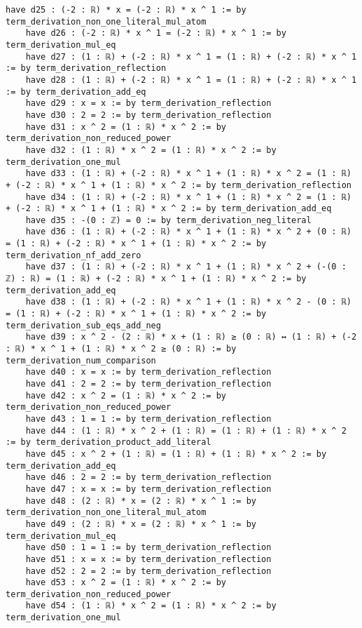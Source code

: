 \documentclass{article}
\begin{document}
\begin{tcolorbox}[colback=white!10, width=\linewidth]
\begin{lstlisting}[language=Lean4]
    have d25 : (-2 : ℝ) * x = (-2 : ℝ) * x ^ 1 := by term_derivation_non_one_literal_mul_atom
    have d26 : (-2 : ℝ) * x ^ 1 = (-2 : ℝ) * x ^ 1 := by term_derivation_mul_eq
    have d27 : (1 : ℝ) + (-2 : ℝ) * x ^ 1 = (1 : ℝ) + (-2 : ℝ) * x ^ 1 := by term_derivation_reflection
    have d28 : (1 : ℝ) + (-2 : ℝ) * x ^ 1 = (1 : ℝ) + (-2 : ℝ) * x ^ 1 := by term_derivation_add_eq
    have d29 : x = x := by term_derivation_reflection
    have d30 : 2 = 2 := by term_derivation_reflection
    have d31 : x ^ 2 = (1 : ℝ) * x ^ 2 := by term_derivation_non_reduced_power
    have d32 : (1 : ℝ) * x ^ 2 = (1 : ℝ) * x ^ 2 := by term_derivation_one_mul
    have d33 : (1 : ℝ) + (-2 : ℝ) * x ^ 1 + (1 : ℝ) * x ^ 2 = (1 : ℝ) + (-2 : ℝ) * x ^ 1 + (1 : ℝ) * x ^ 2 := by term_derivation_reflection
    have d34 : (1 : ℝ) + (-2 : ℝ) * x ^ 1 + (1 : ℝ) * x ^ 2 = (1 : ℝ) + (-2 : ℝ) * x ^ 1 + (1 : ℝ) * x ^ 2 := by term_derivation_add_eq
    have d35 : -(0 : ℤ) = 0 := by term_derivation_neg_literal
    have d36 : (1 : ℝ) + (-2 : ℝ) * x ^ 1 + (1 : ℝ) * x ^ 2 + (0 : ℝ) = (1 : ℝ) + (-2 : ℝ) * x ^ 1 + (1 : ℝ) * x ^ 2 := by term_derivation_nf_add_zero
    have d37 : (1 : ℝ) + (-2 : ℝ) * x ^ 1 + (1 : ℝ) * x ^ 2 + (-(0 : ℤ) : ℝ) = (1 : ℝ) + (-2 : ℝ) * x ^ 1 + (1 : ℝ) * x ^ 2 := by term_derivation_add_eq
    have d38 : (1 : ℝ) + (-2 : ℝ) * x ^ 1 + (1 : ℝ) * x ^ 2 - (0 : ℝ) = (1 : ℝ) + (-2 : ℝ) * x ^ 1 + (1 : ℝ) * x ^ 2 := by term_derivation_sub_eqs_add_neg
    have d39 : x ^ 2 - (2 : ℝ) * x + (1 : ℝ) ≥ (0 : ℝ) ↔ (1 : ℝ) + (-2 : ℝ) * x ^ 1 + (1 : ℝ) * x ^ 2 ≥ (0 : ℝ) := by term_derivation_num_comparison
    have d40 : x = x := by term_derivation_reflection
    have d41 : 2 = 2 := by term_derivation_reflection
    have d42 : x ^ 2 = (1 : ℝ) * x ^ 2 := by term_derivation_non_reduced_power
    have d43 : 1 = 1 := by term_derivation_reflection
    have d44 : (1 : ℝ) * x ^ 2 + (1 : ℝ) = (1 : ℝ) + (1 : ℝ) * x ^ 2 := by term_derivation_product_add_literal
    have d45 : x ^ 2 + (1 : ℝ) = (1 : ℝ) + (1 : ℝ) * x ^ 2 := by term_derivation_add_eq
    have d46 : 2 = 2 := by term_derivation_reflection
    have d47 : x = x := by term_derivation_reflection
    have d48 : (2 : ℝ) * x = (2 : ℝ) * x ^ 1 := by term_derivation_non_one_literal_mul_atom
    have d49 : (2 : ℝ) * x = (2 : ℝ) * x ^ 1 := by term_derivation_mul_eq
    have d50 : 1 = 1 := by term_derivation_reflection
    have d51 : x = x := by term_derivation_reflection
    have d52 : 2 = 2 := by term_derivation_reflection
    have d53 : x ^ 2 = (1 : ℝ) * x ^ 2 := by term_derivation_non_reduced_power
    have d54 : (1 : ℝ) * x ^ 2 = (1 : ℝ) * x ^ 2 := by term_derivation_one_mul

\end{lstlisting}
\end{tcolorbox}
\end{document}
